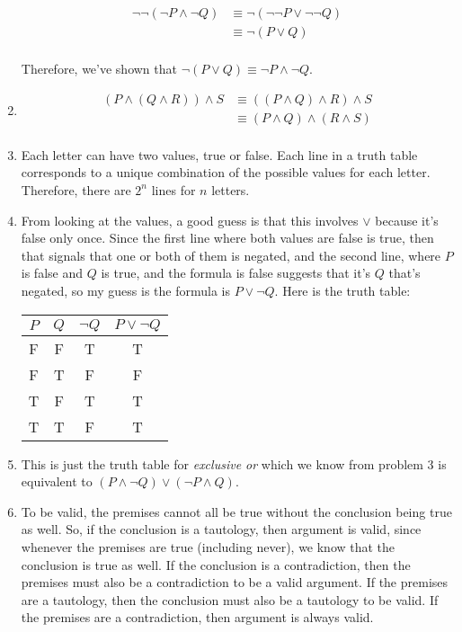 \documentclass{article}
\begin{document}
\begin{enumerate}
  \begin{equation*}
    \begin{aligned}
      \lnot \lnot (\lnot P \land \lnot Q) & \equiv \lnot (\lnot \lnot P \lor \lnot \lnot Q) \\
      & \equiv \lnot (P \lor Q) \\
      \end{aligned}
  \end{equation*}

  Therefore, we've shown that $\lnot (P \lor Q) \equiv \lnot P \land \lnot Q$.

\item
  \begin{equation*}
    \begin{aligned}
      (P \land (Q \land R)) \land S & \equiv ((P \land Q) \land R) \land S \\
      & \equiv (P \land Q) \land (R \land S) \\
    \end{aligned}
  \end{equation*}

\item Each letter can have two values, true or false.  Each line in a truth table corresponds to a unique combination of the possible values for each letter.  Therefore, there are $2^n$ lines for $n$ letters.

\item From looking at the values, a good guess is that this involves $\lor$ because it's false only once.  Since the first line where both values are false is true, then that signals that one or both of them is negated, and the second line, where $P$ is false and $Q$ is true, and the formula is false suggests that it's $Q$ that's negated, so my guess is the formula is $P \lor \lnot Q$.  Here is the truth table:

  \begin{tabular}{c c c c}
    $P$ & $Q$ & $\lnot Q$ & $P \lor \lnot Q$ \\ \hline
    F & F & T & T \\
    F & T & F & F \\
    T & F & T & T \\
    T & T & F & T \\
    \end{tabular}

\item This is just the truth table for \textit{exclusive or} which we know from problem 3 is equivalent to $(P \land \lnot Q) \lor (\lnot P \land Q)$.

\item To be valid, the premises cannot all be true without the conclusion being true as well.  So, if the conclusion is a tautology, then argument is valid, since whenever the premises are true (including never), we know that the conclusion is true as well.  If the conclusion is a contradiction, then the premises must also be a contradiction to be a valid argument.	 If the premises are a tautology, then the conclusion must also be a tautology to be valid.  If the premises are a contradiction, then argument is always valid.
\end{enumerate}
\end{document}
